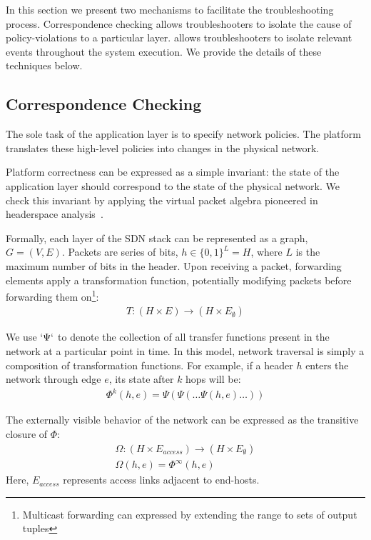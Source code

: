 In this section we present two mechanisms to facilitate the troubleshooting
process. Correspondence checking allows troubleshooters to isolate
the cause of policy-violations to a particular layer. \Simulator{}
allows troubleshooters to isolate relevant events throughout the system
execution. We provide the details of these techniques below. 

\subsection{Correspondence Checking}

The sole task of the application layer is to specify network
policies. The platform translates these high-level policies
into changes in the physical network.

Platform correctness can be expressed as a simple invariant:
the state of the application layer should correspond to the state of the
physical network. We check this invariant by applying the virtual packet
algebra pioneered in headerspace analysis~\cite{hsa}. 

Formally, each layer of the SDN stack can be represented as a graph,
$G = (V, E)$. Packets are series of bits, $h \in \{0,1\}^L = H$,
where $L$ is the maximum number of bits in the header. Upon receiving a packet,
forwarding elements apply a transformation function, potentially modifying
packets before forwarding them on\footnote{Multicast forwarding can expressed
by extending the range to sets of output tuples}:
\begin{align*}
T: (H \times E) \rightarrow (H \times E_{\emptyset})
\end{align*}

We use $`\Psi`$ to denote the collection of all transfer functions present in
the network at a particular point in time. In this model, network traversal is simply a composition of transformation
functions. For example, if a header $h$ enters the network through edge
$e$, its state after $k$ hops will be:
\begin{align*}
\Phi^k(h,e) = \Psi(\Psi(\dots \Psi(h,e)\dots))
\end{align*}

The externally visible behavior of the network can be expressed as the
transitive closure of $\Phi$:
\begin{align*}
\Omega: (H \times E_{access}) \rightarrow (H \times E_{\emptyset}) \\
\Omega(h,e) = \Phi^{\infty}(h,e)
\end{align*}
Here, $E_{access}$ represents access links adjacent to end-hosts.

